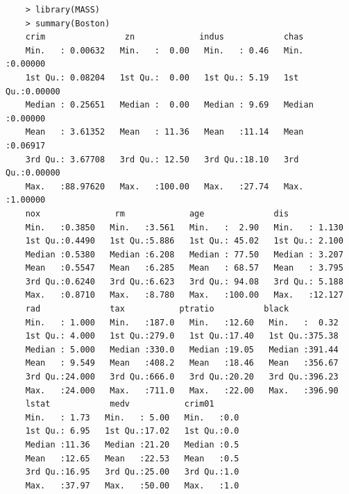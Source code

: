 \documentclass{article}
\begin{document}
\begin{program}
	\begin{verbatim}
	> library(MASS)
	> summary(Boston)
	crim                zn             indus            chas        
	Min.   : 0.00632   Min.   :  0.00   Min.   : 0.46   Min.   :0.00000  
	1st Qu.: 0.08204   1st Qu.:  0.00   1st Qu.: 5.19   1st Qu.:0.00000  
	Median : 0.25651   Median :  0.00   Median : 9.69   Median :0.00000  
	Mean   : 3.61352   Mean   : 11.36   Mean   :11.14   Mean   :0.06917  
	3rd Qu.: 3.67708   3rd Qu.: 12.50   3rd Qu.:18.10   3rd Qu.:0.00000  
	Max.   :88.97620   Max.   :100.00   Max.   :27.74   Max.   :1.00000  
	nox               rm             age              dis        
	Min.   :0.3850   Min.   :3.561   Min.   :  2.90   Min.   : 1.130  
	1st Qu.:0.4490   1st Qu.:5.886   1st Qu.: 45.02   1st Qu.: 2.100  
	Median :0.5380   Median :6.208   Median : 77.50   Median : 3.207  
	Mean   :0.5547   Mean   :6.285   Mean   : 68.57   Mean   : 3.795  
	3rd Qu.:0.6240   3rd Qu.:6.623   3rd Qu.: 94.08   3rd Qu.: 5.188  
	Max.   :0.8710   Max.   :8.780   Max.   :100.00   Max.   :12.127  
	rad              tax           ptratio          black       
	Min.   : 1.000   Min.   :187.0   Min.   :12.60   Min.   :  0.32  
	1st Qu.: 4.000   1st Qu.:279.0   1st Qu.:17.40   1st Qu.:375.38  
	Median : 5.000   Median :330.0   Median :19.05   Median :391.44  
	Mean   : 9.549   Mean   :408.2   Mean   :18.46   Mean   :356.67  
	3rd Qu.:24.000   3rd Qu.:666.0   3rd Qu.:20.20   3rd Qu.:396.23  
	Max.   :24.000   Max.   :711.0   Max.   :22.00   Max.   :396.90  
	lstat            medv           crim01   
	Min.   : 1.73   Min.   : 5.00   Min.   :0.0  
	1st Qu.: 6.95   1st Qu.:17.02   1st Qu.:0.0  
	Median :11.36   Median :21.20   Median :0.5  
	Mean   :12.65   Mean   :22.53   Mean   :0.5  
	3rd Qu.:16.95   3rd Qu.:25.00   3rd Qu.:1.0  
	Max.   :37.97   Max.   :50.00   Max.   :1.0 
	
	\end{verbatim}
\end{program}



\newpage
\end{document}
